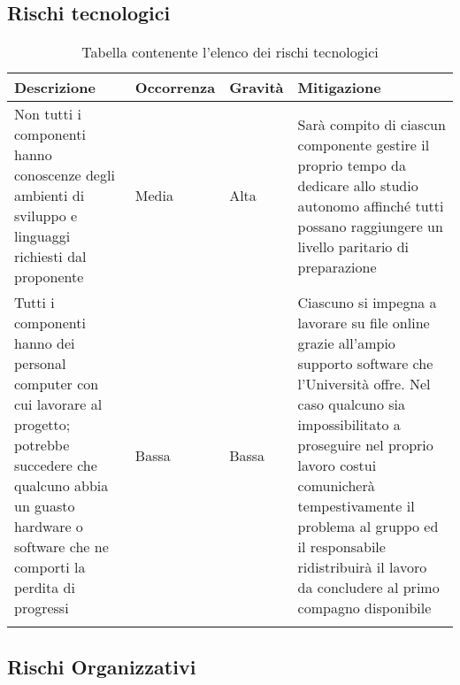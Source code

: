 \documentclass[../piano_di_progetto.tex]{subfiles}
\begin{document}
\newpage

\subsection{Rischi tecnologici}%
\label{sub:rischi_tec}

\begin{center}
	\begin{longtable}{| p{3.5cm} | p{2cm}|p{2cm}|p{3.5cm}|}
		\hline
		\rowcolor{lightgray}
		{\textbf{Descrizione}} & {\textbf{Occorrenza}} & {\textbf{Gravità}} & {\textbf{Mitigazione}} \\

		\hline
			Non tutti i componenti hanno conoscenze degli ambienti di sviluppo e linguaggi richiesti dal proponente

			&
			Media
			& 
			Alta
			&
			Sarà compito di ciascun componente gestire il proprio tempo da dedicare allo studio autonomo affinché tutti possano raggiungere un livello paritario di preparazione 
\\			
			\hline
			Tutti i componenti hanno dei personal computer con cui lavorare al progetto; potrebbe succedere che qualcuno abbia un guasto hardware o software che ne comporti la perdita di progressi

			&
			Bassa
			& 
			Bassa
			& 
			Ciascuno si impegna a lavorare su file online grazie all’ampio supporto software che l’Università offre. Nel caso qualcuno sia impossibilitato a proseguire nel proprio lavoro costui comunicherà tempestivamente il problema al gruppo ed il responsabile ridistribuirà il lavoro da concludere al primo compagno disponibile\\
			\hline
\caption{Tabella contenente l'elenco dei rischi tecnologici}
	\end{longtable}

\end{center}

\subsection{Rischi Organizzativi}%
\label{sub:rischi_org}
\end{document}
